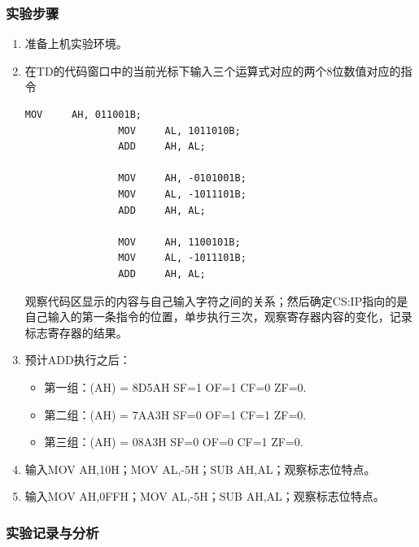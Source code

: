 \documentclass{article}
\newenvironment{codeFont}{\codeF}{\par}
\begin{document}
	\subsubsection{实验步骤}
	\begin{enumerate}
		\item 准备上机实验环境。
		\item 在TD的代码窗口中的当前光标下输入三个运算式对应的两个8位数值对应的指令
			\begin{codeFont}
			\begin{lstlisting}[gobble=16]
				MOV		AH, 011001B;
				MOV		AL, 1011010B;
				ADD		AH, AL;

				MOV		AH, -0101001B;
				MOV		AL, -1011101B;
				ADD		AH, AL;

				MOV		AH, 1100101B;
				MOV		AL, -1011101B;
				ADD		AH, AL;
			\end{lstlisting}
			\end{codeFont}
			观察代码区显示的内容与自己输入字符之间的关系；然后确定CS:IP指向的是自己输入的第一条指令的位置，单步执行三次，观察寄存器内容的变化，记录标志寄存器的结果。
		\item 预计ADD执行之后：
			\begin{itemize}
				\item 第一组：(AH) = 8D5AH	SF=1	OF=1	CF=0	ZF=0.
				\item 第二组：(AH) = 7AA3H	SF=0	OF=1	CF=1	ZF=0.
				\item 第三组：(AH) = 08A3H		SF=0	OF=0	CF=1	ZF=0.
			\end{itemize}
		\item 输入MOV AH,10H；MOV AL,-5H；SUB AH,AL；观察标志位特点。
		\item 输入MOV AH,0FFH；MOV AL,-5H；SUB AH,AL；观察标志位特点。
	\end{enumerate}

	\subsubsection{实验记录与分析}
\end{document}
